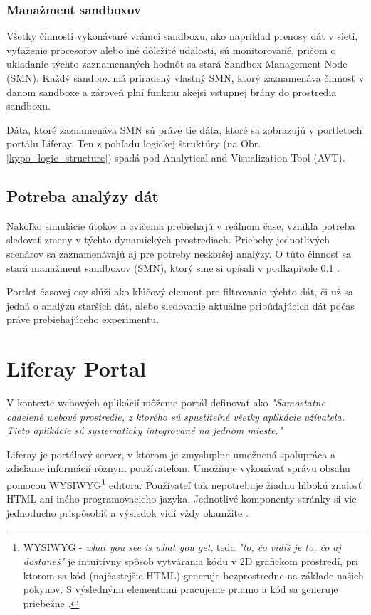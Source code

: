 \documentclass[
  digital, %
  twoside, %
  notable,   %
  nolof,   %
  nolot,   %
]{fithesis3}
\begin{document}
\subsection{Manažment sandboxov}
\label{smn}
Všetky činnosti vykonávané vrámci sandboxu, ako napríklad prenosy dát v sieti, vyťaženie procesorov alebo iné dôležité udalosti, sú monitorované, pričom o ukladanie týchto zaznamenaných hodnôt sa stará Sandbox Management Node (SMN). Každý sandbox má priradený vlastný SMN, ktorý zaznamenáva činnosť v danom sandboxe a zároveň plní funkciu akejsi vstupnej brány do prostredia sandboxu\cite{eichler2014analytical}.

Dáta, ktoré zaznamenáva SMN sú práve tie dáta, ktoré sa zobrazujú v portletoch portálu Liferay. Ten z pohľadu logickej štruktúry (na Obr. \ref{kypo_logic_structure}) spadá pod Analytical and Visualization Tool (AVT).

\section{Potreba analýzy dát}
Nakoľko simulácie útokov a cvičenia prebiehajú v reálnom čase, vznikla potreba sledovať zmeny v týchto dynamických prostrediach. Priebehy jednotlivých scenárov sa zaznamenávajú aj pre potreby neskoršej analýzy. O túto činnosť sa stará manažment sandboxov (SMN), ktorý sme si opísali v podkapitole \ref{smn} .

Portlet časovej osy slúži ako kľúčový element pre filtrovanie týchto dát, či už sa jedná o analýzu starších dát, alebo sledovanie aktuálne pribúdajúcich dát počas práve prebiehajúceho experimentu.

\chapter{Liferay Portal}
\label{liferay}
V kontexte webových aplikácií môžeme portál definovať \cite{sezov2011liferay} ako \textit{"Samostatne oddelené webové prostredie, z ktorého sú spustiteľné všetky aplikácie užívateľa. Tieto aplikácie sú systematicky integrované na jednom mieste."}

Liferay je portálový server, v ktorom je zmysluplne umožnená spolupráca a zdieľanie informácií rôznym používateľom. Umožňuje vykonávať správu obsahu pomocou WYSIWYG\footnote{WYSIWYG - \textit{what you see is what you get}, teda \textit{"to, čo vidíš je to, čo aj dostaneš"} je intuitívny spôsob vytvárania kódu v 2D grafickom prostredí, pri ktorom sa kód (najčastejšie HTML) generuje bezprostredne na základe našich pokynov. S výslednými elementami pracujeme priamo a kód sa generuje priebežne \cite{guo2011wysiwyg}.} editora. Používateľ tak nepotrebuje žiadnu hlbokú znalosť HTML ani iného programovacieho jazyka. Jednotlivé komponenty stránky si vie jednoducho prispôsobiť a výsledok vidí vždy okamžite \cite{sezov2011liferay}.
\end{document}
